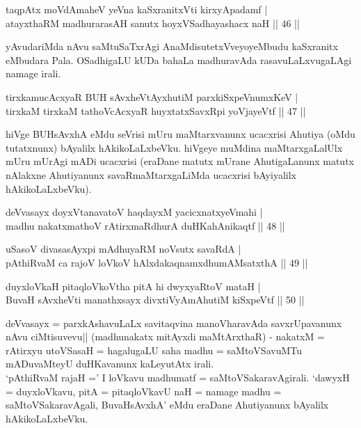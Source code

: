 
\begin{shl}
taqpAtx moVdAmaheV yeVna kaSxranitxVti kirxyApadamf | \\
atayxthaRM madhurarasAH sanutx hoyxVSadhayashacx naH \hfill|| 46 || 
\end{shl}

\begin{artha}
yAvudariMda nAvu saMtuSaTxrAgi AnaMdisutetxVveyo\-\break yeMbudu kaSxranitx 
eMbudara Pala. OSadhigaLU kUDa bahaLa madhuravAda rasavuLaLxvugaLAgi 
namage irali.
\end{artha}

\begin{shl}
tirxkamucAcxyaR BUH sAvxheVtAyxhutiM parxkiSxpeVnumxKeV | \\
tirxkaM tirxkaM tathoVcAcxyaR huyxtatxSavxRpi yoVjayeVtf \hfill|| 47 || 
\end{shl}

\begin{artha}
hiVge BUHsAvxhA eMdu seVrisi mUru maMtarxvanunx ucacxrisi Ahutiya 
(oMdu tutatxnunx) bAyalilx hAkikoLaLxbeVku. hiVgeye muMdina 
maMtarxgaLalUlx mUru mUrAgi mADi ucacxrisi (eraDane matutx mUrane 
AhutigaLanunx matutx nAlakxne Ahutiyanunx savaRmaMtarxgaLiMda 
ucacxrisi bAyiyalilx hAkikoLaLxbeVku).
\end{artha}


\begin{shl}
deVvasayx doyxVtanavatoV haqdayxM yacicxnatxyeVmahi | \\
madhu nakatxmathoV rAtirxmaRdhurA duHKahAnikaqtf \hfill|| 48 || 
\end{shl}

\begin{shl}
uSasoV divasasAyxpi mAdhuyaRM noV\s sutx savaRdA | \\
pAthiRvaM ca rajoV loVkoV hAlxdakaqnamxdhumAMsatxthA \hfill|| 49 || 
\end{shl}

\begin{shl}
duyxloVkaH pitaqloVkoV\s tha pitA hi dwyxyaRtoV mataH | \\
BuvaH sAvxheVti manathxsayx divxtiVyAmAhutiM kiSxpeVtf \hfill|| 50 || 
\end{shl}

\begin{artha}
deVvasayx = parxkAshavuLaLx savitaqvina manoVharavAda savxrUpavanunx 
nAvu ciMtisuvevu|| (madhunakatx mitAyxdi maMtArxthaR) - nakatxM = 
rAtirxyu utoVSasaH = hagalugaLU saha madhu = saMtoVSavuMTu mADuvaMteyU 
duHKavanunx kaLeyutAtx irali.\\
`pAthiRvaM rajaH =' I loVkavu madhumatf = saMtoVSakaravAgirali. `dawyxH 
= duyxloVkavu, pitA = pitaqloVkavU naH = namage madhu = 
saMtoVSakaravAgali, BuvaHsAvxhA' eMdu eraDane Ahutiyanunx bAyalilx 
hAkikoLaLxbeVku.
\end{artha}

